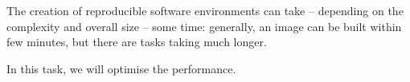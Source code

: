 \begin{task}[
  title=Performance optimisation,
  id=performance-optimisation,
  lead=QS,
  PM=9,
  wphases={0-24!0.375},
  partners={SRL}
]
  The creation of reproducible software environments can take -- depending on
  the complexity and overall size -- some time: generally, an image can be built
  within few minutes, but there are tasks taking much longer.

  In this task, we will optimise the \repotodocker{} performance.


\end{task}
